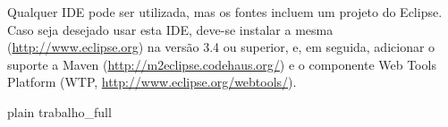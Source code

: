 \documentclass{abnt}
\begin{document}
Qualquer IDE pode ser utilizada, mas os fontes incluem um projeto do Eclipse. Caso seja desejado usar esta IDE, deve-se instalar a mesma (\url{http://www.eclipse.org}) na versão 3.4 ou superior, e, em seguida, adicionar o suporte a Maven (\url{http://m2eclipse.codehaus.org/}) e o componente Web Tools Platform (WTP, \url{http://www.eclipse.org/webtools/}).

\nocite{*}
 {plain}
 {trabalho_full}
\end{document}
